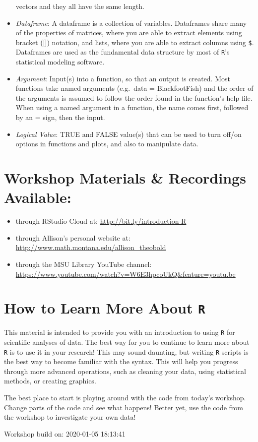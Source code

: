 \documentclass[]{article}
\begin{document}
\begin{itemize}
  vectors and they all have the same length.
\item
  \emph{Dataframe}: A dataframe is a collection of variables. Dataframes
  share many of the properties of matrices, where you are able to
  extract elements using bracket ({[}{]}) notation, and lists, where you
  are able to extract columns using \texttt{\$}. Dataframes are used as
  the fundamental data structure by most of \texttt{R}'s statistical
  modeling software.
\item
  \emph{Argument}: Input(s) into a function, so that an output is
  created. Most functions take named arguments (e.g.~data =
  BlackfootFish) and the order of the arguments is assumed to follow the
  order found in the function's help file. When using a named argument
  in a function, the name comes first, followed by an = sign, then the
  input.
\item
  \emph{Logical Value}: TRUE and FALSE value(s) that can be used to turn
  off/on options in functions and plots, and also to manipulate data.
\end{itemize}

\newpage

\section{Workshop Materials \& Recordings
Available:}\label{workshop-materials-recordings-available}

\begin{itemize}
\item
  through RStudio Cloud at: \url{http://bit.ly/introduction-R}
\item
  through Allison's personal website at:
  \url{http://www.math.montana.edu/allison_theobold}
\item
  through the MSU Library YouTube channel:
  \url{https://www.youtube.com/watch?v=W6E3hpcoUkQ\&feature=youtu.be}
\end{itemize}

\section{\texorpdfstring{How to Learn More About
\texttt{R}}{How to Learn More About R}}\label{how-to-learn-more-about-r}

This material is intended to provide you with an introduction to using
\texttt{R} for scientific analyses of data. The best way for you to
continue to learn more about \texttt{R} is to use it in your research!
This may sound daunting, but writing \texttt{R} scripts is the best way
to become familiar with the syntax. This will help you progress through
more advanced operations, such as cleaning your data, using statistical
methods, or creating graphics.

The best place to start is playing around with the code from today's
workshop. Change parts of the code and see what happens! Better yet, use
the code from the workshop to investigate your own data!

\vspace{4cm}

Workshop build on: 2020-01-05 18:13:41
\end{document}
